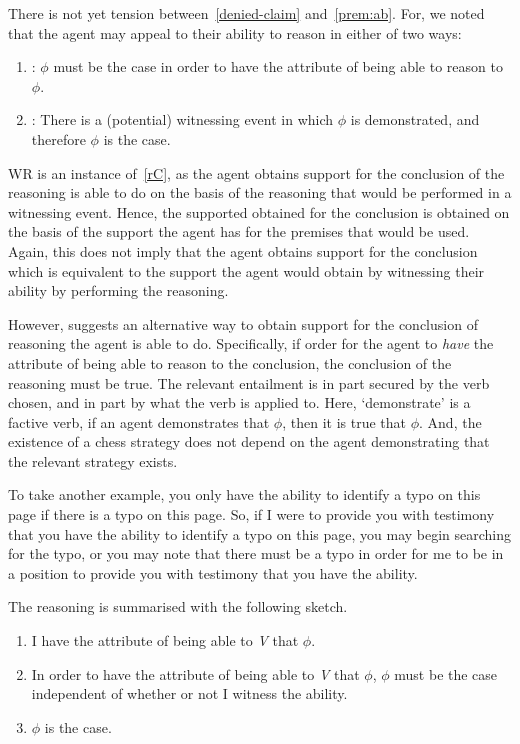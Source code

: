 \begin{note}[Attribute]
  There is not yet tension between~\ref{denied-claim} and~\ref{prem:ab}.
  For, we noted that the agent may appeal to their ability to reason in either of two ways:
  \begin{enumerate}[label=\(\cdot\)]
  \item \AR{}: \(\phi\) must be the case in order to have the attribute of being able to reason to \(\phi\).
  \item \WR{}: There is a (potential) witnessing event in which \(\phi\) is demonstrated, and therefore \(\phi\) is the case.
  \end{enumerate}
  WR{} is an instance of~\ref{rC}, as the agent obtains support for the conclusion of the reasoning is able to do on the basis of the reasoning that would be performed in a witnessing event.
  Hence, the supported obtained for the conclusion is obtained on the basis of the support the agent has for the premises that would be used.
  Again, this does not imply that the agent obtains support for the conclusion which is equivalent to the support the agent would obtain by witnessing their ability by performing the reasoning.

  However, \AR{} suggests an alternative way to obtain support for the conclusion of reasoning the agent is able to do.
  Specifically, if order for the agent to \emph{have} the attribute of being able to reason to the conclusion, the conclusion of the reasoning must be true.
  The relevant entailment is in part secured by the verb chosen, and in part by what the verb is applied to.
  Here, `demonstrate' is a factive verb, if an agent demonstrates that \(\phi\), then it is true that \(\phi\).
  And, the existence of a chess strategy does not depend on the agent demonstrating that the relevant strategy exists.

  To take another example, you only have the ability to identify a typo on this page if there is a typo on this page.
  So, if I were to provide you with testimony that you have the ability to identify a typo on this page, you may begin searching for the typo, or you may note that there must be a typo in order for me to be in a position to provide you with testimony that you have the ability.

  The reasoning is summarised with the following sketch.

  \begin{enumerate}[label=(\textsf{A}\arabic*), ref=(\textsf{A}\arabic*)]
  \item\label{WR:Sketch:1} I have the attribute of being able to \emph{V} that \(\phi\).
  \item\label{WR:Sketch:2} In order to have the attribute of being able to \emph{V} that \(\phi\), \(\phi\) must be the case independent of whether or not I witness the ability.
  \item\label{WR:Sketch:3} \(\phi\) is the case.
  \end{enumerate}


\end{note}
